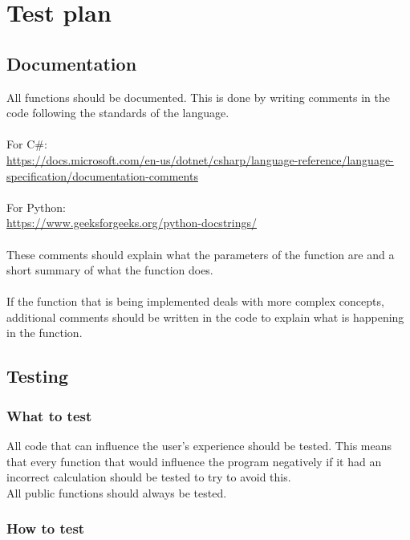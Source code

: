 \section{Test plan}
\label{app:test-plan}
\subsection{Documentation}
All functions should be documented. 
This is done by writing comments in the code following the standards of the language.
\\\\
For C\#: 
\\
\url{https://docs.microsoft.com/en-us/dotnet/csharp/language-reference/language-specification/documentation-comments}
\\\\
For Python:
\\
\url{https://www.geeksforgeeks.org/python-docstrings/}
\\\\
These comments should explain what the parameters of the function are and a short summary of what the function does.
\\\\
If the function that is being implemented deals with more complex concepts, additional comments should be written in the code to explain what is happening in the function.

\subsection{Testing}
\subsubsection{What to test}
All code that can influence the user's experience should be tested. 
This means that every function that would influence the program negatively if it had an incorrect calculation should be tested to try to avoid this.
\\
All public functions should always be tested.

\subsubsection{How to test}

